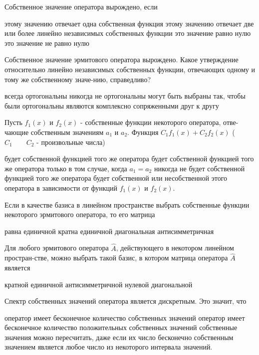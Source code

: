 \documentclass[11pt,a4paper]{exam}
\begin{document}
\begin{questions}
\question Собственное значение оператора вырождено, если
\begin{choices}
\choice этому значению отвечает одна собственная функция
\choice этому значению отвечает две или более линейно независимых собственных функции
\choice это значение равно нулю
\choice это значение не равно нулю 
\end{choices}

\question Собственное значение эрмитового оператора вырождено. Какое утверждение относительно линейно независимых собственных функции, отвечающих одному и тому же собственному значе-нию,  справедливо?
\begin{choices}
\choice всегда ортогональны
\choice никогда не ортогональны 
\choice могут быть выбраны так, чтобы были ортогональны
\choice являются комплексно сопряженными друг к другу
\end{choices}

\question Пусть ${{f}_{1}}(x)$ и ${{f}_{2}}(x)$ - собственные функции некоторого оператора, отве-чающие собственным значениям ${{a}_{1}}$ и ${{a}_{2}}$. Функция ${{C}_{1}}{{f}_{1}}(x)+{{C}_{2}}{{f}_{2}}(x)$ (${{C}_{1}}\quad \text{}\quad {{C}_{2}}$ - произвольные числа)
\begin{choices}
\choice будет собственной функцией того же оператора
\choice будет собственной функцией того же оператора только в том случае, когда ${{a}_{1}}={{a}_{2}}$
\choice никогда не будет собственной функцией того же оператора
\choice будет собственной или несобственной этого оператора в зависимости от функций ${{f}_{1}}(x)$ и ${{f}_{2}}(x)$.
\end{choices}

\question Если в качестве базиса в линейном пространстве выбрать собственные функции некоторого эрмитового оператора, то его матрица 
\begin{choices}
\choice равна единичной    
\choice кратна единичной      
\choice диагональная 
\choice антисимметричная
\end{choices}

\question Для любого эрмитового оператора $\hat{A}$, действующего в некотором линейном простран-стве, можно выбрать такой базис, в котором матрица оператора $\hat{A}$ является
\begin{choices}
\choice кратной единичной  
\choice антисимметричной   
\choice нулевой      
\choice диагональной
\end{choices}

\question Спектр собственных значений оператора является дискретным. Это значит, что
\begin{choices}
\choice оператор имеет бесконечное количество собственных значений
\choice оператор имеет бесконечное количество положительных собственных значений
\choice собственные значения можно пересчитать, даже если их число бесконечно
\choice собственным значением является любое число из некоторого интервала значений.
\end{choices}


\end{questions}
\end{document}
